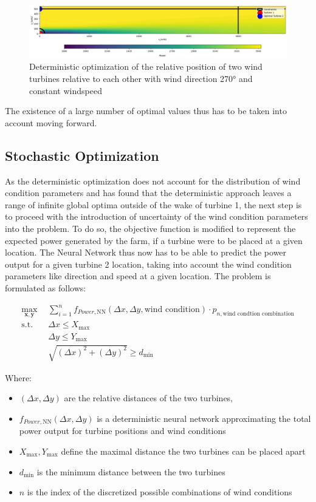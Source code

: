 \begin{figure}[h] 
	\centering
	\includegraphics[width=1\textwidth]{figures/optimization/opti_determ270.png} 
	\caption{Deterministic optimization of the relative position of two wind turbines relative to each other with wind direction 270° and constant windspeed}
	\label{fig:opti_determ270}
\end{figure}

The existence of a large number of optimal values thus has to be taken into account moving forward.


\subsection{Stochastic Optimization}

As the deterministic optimization does not account for the distribution of wind condition parameters and has found that the deterministic approach leaves a range of infinite global optima outside of the wake of turbine 1, the next step is to proceed with the introduction of uncertainty of the wind condition parameters into the problem. To do so, the objective function is modified to represent the expected power generated by the farm, if a turbine were to be placed at a given location. The Neural Network thus now has to be able to predict the power output for a given turbine 2 location, taking into account the wind condition parameters like direction and speed at a given location. The problem is formulated as follows: 

\begin{align}
	\max_{\mathbf{x}, \mathbf{y}} &  \sum_{i=1}^{n} f_{Power,\text{NN}}(\Delta x, \Delta y, \text{wind condition})\cdot p_{n,\text{wind condtion combination}} \\
	\text{s.t.} \quad 
	&  \Delta x \leq X_{\max} \\
	&  \Delta y \leq Y_{\max} \\
	& \sqrt{(\Delta x)^2 + (\Delta y)^2} \geq d_{\min}
\end{align}

Where:
\begin{itemize}
	\item \( (\Delta x, \Delta y) \) are the relative distances of the two turbines,
	\item \( f_{Power, \text{NN}}(\Delta x, \Delta y)\) is a deterministic neural network  approximating the total power output for turbine positions and wind conditions
	\item \(  X_{\max}, Y_{\max} \) define the maximal distance the two turbines can be placed apart
	\item \( d_{\min} \) is the minimum distance between the two turbines
	\item \( n \) is the index of the discretized possible combinations of wind conditions 
\end{itemize}

